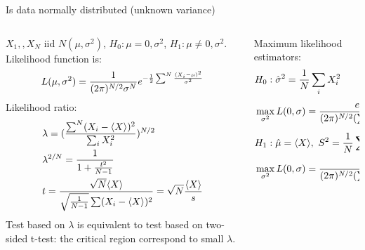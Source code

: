 \documentclass[asd-beamer.tex]{subfiles}%
\begin{document}
\begin{wordonframe}{Is data normally distributed (unknown variance)}
\begin{columns}[T]
	\begin{column}{0.55\textwidth}
$X_1,,X_N$ iid $N(\mu,\sigma^2)$, $H_0: \mu=0,\sigma^2$, $H_1: \mu\neq0,\sigma^2$.
Likelihood function is: 
\begin{equation*}
L(\mu,\sigma^2)=\frac{1}{(2\pi)^{N/2}\sigma^N}e^{-\frac{1}{2}\sum^N\frac{(X_i-\mu)^2}{\sigma^2}}
\end{equation*}
Likelihood ratio:
\begin{align*}
&\lambda=(\frac{\sum^N(X_i-\langle X \rangle)^2}{\sum_iX_i^2})^{N/2}\\
&\lambda^{2/N}=\frac{1}{1+\frac{t^2}{N-1}}\\
&t=\frac{\sqrt{N}\langle X \rangle}{\sqrt{\frac{1}{N-1}}\sum(X_i-\langle X \rangle)^2}=\sqrt{N}\frac{\langle X \rangle}{s}
\end{align*}
Test based on $\lambda$ is equivalent to test based on two-sided t-test: the critical region correspond to small $\lambda$.
	\end{column}
	\begin{column}{0.45\textwidth}
Maximum likelihood estimators:
\begin{align*}
&H_0: \hat{\sigma}^2=\frac{1}{N}\sum_iX_i^2\\
&\max_{\sigma^2}L(0,\sigma)=\frac{e^{-N/2}}{(2\pi)^{N/2}(\sum_iX_i/N)^{N/2}}\\
&H_1: \hat{\mu}=\langle X \rangle,\ S^2=\frac{1}{N}\sum^N(X_i-\langle X \rangle)^2\\
&\max_{\sigma^2}L(0,\sigma)=\frac{e^{-N/2}}{(2\pi)^{N/2}(\sum_i(X_i-\langle X \rangle)^2/N)^{N/2}}\\
\end{align*}
	\end{column}
\end{columns}

\end{wordonframe}
\end{document}

